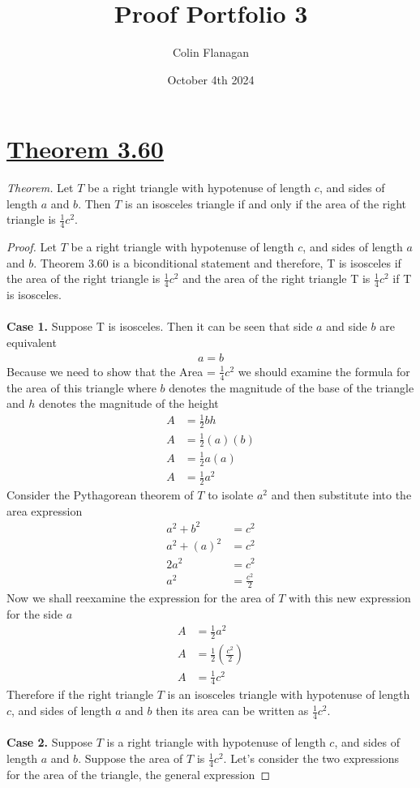 \documentclass{article}
\title{Proof Portfolio 3}
\author{Colin Flanagan}
\date{October 4th 2024}
\begin{document}
\maketitle

\section*{\underline{Theorem 3.60}} 

\textit{Theorem.} Let $T$ be a right triangle with hypotenuse of length $c$, and sides of length $a$ and $b$. Then $T$ is an isosceles triangle if and only if the area of the right triangle is $\frac{1}{4}c^2$.
    \begin{proof}
     Let $T$ be a right triangle with hypotenuse of length $c$, and sides of length $a$ and $b$. Theorem 3.60 is a biconditional statement and therefore, T is isosceles if the area of the right triangle is $\frac{1}{4}c^2$ and the area of the right triangle T is $\frac{1}{4}c^2$ if T is isosceles.\\
     \\
     \textbf{Case 1.} Suppose T is isosceles. Then it can be seen that side $a$ and side $b$ are equivalent 
     \begin{align*}
         a = b
     \end{align*}
     Because we need to show that the Area = $\frac{1}{4}c^2$ we should examine the formula for the area of this triangle where $b$ denotes the magnitude of the base of the triangle and $h$ denotes the magnitude of the height
     \begin{align*}
         A &= \frac{1}{2}bh\\
         A &= \frac{1}{2}(a)(b)\\
         A &= \frac{1}{2}a(a)\\
         A &= \frac{1}{2}a^2
     \end{align*}
     Consider the Pythagorean theorem of $T$ to isolate $a^2$ and then substitute into the area expression
     \begin{align*}
        a^2 + b^2 &= c^2\\
        a^2 + (a)^2 &= c^2 \\
        2a^2 &= c^2\\
        a^2 &= \frac{c^2}{2}
     \end{align*}
     Now we shall reexamine the expression for the area of $T$ with this new expression for the side $a$
     \begin{align*}
         A &= \frac{1}{2}a^2\\
         A &= \frac{1}{2}(\frac{c^2}{2})\\
         A &= \frac{1}{4}c^2
     \end{align*}
     Therefore if the right triangle $T$ is an isosceles triangle with hypotenuse of length $c$, and sides of length $a$ and $b$ then its area can be written as $\frac{1}{4}c^2$.\\
     \\
     \textbf{Case 2.} Suppose $T$ is a right triangle with hypotenuse of length $c$, and sides of length $a$ and $b$. Suppose the area of $T$ is $\frac{1}{4}c^2$.  Let's consider the two expressions for the area of the triangle, the general expression


\end{proof}
\end{document}
